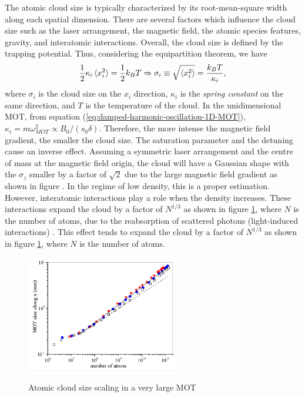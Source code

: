 The atomic cloud size is typically characterized by its root-mean-square width along each spatial dimension. There are several factors which influence the cloud size such as the laser arrangement, the magnetic field, the atomic species features, gravity, and interatomic interactions. Overall, the cloud size is defined by the trapping potential. Thus, considering the equipartition theorem, we have
\begin{equation}
	\frac{1}{2} \kappa_{i} \braket{x_i^2} = \frac{1}{2}k_B T
	\Rightarrow \sigma_{i} \equiv \sqrt{\braket{x_i^2}} = \frac{k_B T}{\kappa_{i}} ,
\end{equation}
where $ \sigma_{i} $ is the cloud size on the $ x_i $ direction, $ \kappa_{i} $ is the \textit{spring constant} on the same direction, and $ T $ is the temperature of the cloud. In the unidimensional MOT, from equation (\ref{eq:damped-harmonic-oscillation-1D-MOT}), $ \kappa_{i} = m\omega_{MOT}^2 \propto B_0 / (s_0 \delta)$. Therefore, the more intense the magnetic field gradient, the smaller the cloud size. The saturation parameter and the detuning cause an inverse effect. Assuming a symmetric laser arrangement and the centre of mass at the magnetic field origin, the cloud will have a Gaussian shape with the $ \sigma_z $ smaller by a factor of $ \sqrt{2} $ due to the large magnetic field gradient as shown in figure . In the regime of low density, this is a proper estimation. However, interatomic interactions play a role when the density increases. These interactions expand the cloud by a factor of $ N^{1/3} $ as shown in figure \ref{fig:cloud-size-scaling}, where $ N $ is the number of atoms, due to the reabsorption of scattered photons (light-induced interactions) \cite{PhysRevA.90.063404}. This effect tends to expand the cloud by a factor of $ N^{1/3} $ as shown in figure \ref{fig:cloud-size-scaling}, where $ N $ is the number of atoms.

\begin{figure}[!ht]
    \centering
    \caption{Atomic cloud size scaling in a very large MOT}
    \includegraphics[width=0.6\textwidth]{USPSC-img/atomic-cloud-size-scaling.png}
    \label{fig:cloud-size-scaling}
    \vspace{-20pt}
\end{figure}

